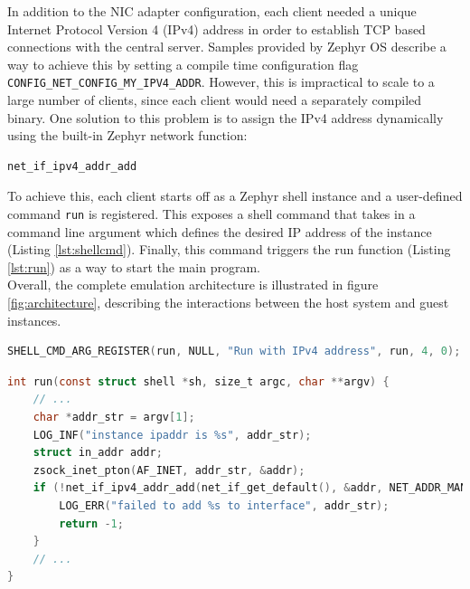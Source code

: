 \documentclass[12pt]{article}
\begin{document}
In addition to the NIC adapter configuration, each client needed a unique Internet Protocol Version
4 (IPv4) address in order to establish TCP based connections with the central server. Samples
provided by Zephyr OS describe a way to achieve this by setting a compile time configuration flag\\
\verb|CONFIG_NET_CONFIG_MY_IPV4_ADDR|. However, this is impractical to scale to a large number of clients, since
each client would need a separately compiled binary. One solution to this problem is to assign the IPv4 address
dynamically using the built-in Zephyr network function\cite{schirrmeister_2020_simulation}:
\begin{verbatim}
net_if_ipv4_addr_add
\end{verbatim}
To achieve this, each client starts off as a Zephyr shell instance and a user-defined command
\verb|run| is registered. This exposes a shell command that takes in a command line argument which defines the desired IP address of the
instance (Listing \ref{lst:shellcmd}). Finally, this command triggers the run function
(Listing \ref{lst:run}) as a way to start the main program. \\

Overall, the complete emulation architecture is illustrated in figure \ref{fig:architecture},
describing the interactions between the host system and guest instances. \\

\begin{lstlisting}[language=C, caption=Registering user defined command ``run'' to the function
pointer run,label={lst:shellcmd}]
SHELL_CMD_ARG_REGISTER(run, NULL, "Run with IPv4 address", run, 4, 0);
\end{lstlisting}

\begin{lstlisting}[language=C, caption=The ``run'' function which performs IP address assignment at
runtime,label={lst:run}]
int run(const struct shell *sh, size_t argc, char **argv) {
    // ...
    char *addr_str = argv[1];
    LOG_INF("instance ipaddr is %s", addr_str);
    struct in_addr addr;
    zsock_inet_pton(AF_INET, addr_str, &addr);
    if (!net_if_ipv4_addr_add(net_if_get_default(), &addr, NET_ADDR_MANUAL, UINT32_MAX)) {
        LOG_ERR("failed to add %s to interface", addr_str);
        return -1;
    }
    // ...
}
\end{lstlisting}
\end{document}
